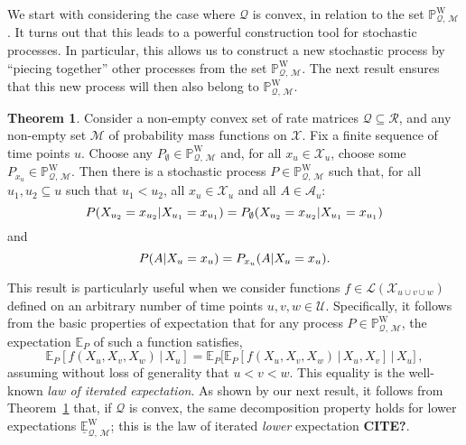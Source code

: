 \documentclass[10pt,a4paper]{paper}
\theoremstyle{definition}
\newtheorem{theorem}{Theorem}[section]
\newcommand{\states}{\mathcal{X}}
\newcommand{\processes}{\mathbb{P}}
\newcommand{\wprocesses}{\processes^{\mathrm{W}}}
\newcommand{\gambles}{\mathcal{L}}
\newcommand{\rateset}{\mathcal{Q}}
\begin{document}
We start with considering the case where $\rateset$ is convex, in relation to the set $\wprocesses_{\rateset,\,\mathcal{M}}$. It turns out that this leads to a powerful construction tool for stochastic processes. In particular, this allows us to construct a new stochastic process by ``piecing together'' other processes from the set $\wprocesses_{\rateset,\,\mathcal{M}}$. The next result ensures that this new process will then also belong to $\wprocesses_{\rateset,\,\mathcal{M}}$.
\begin{theorem}\label{theo:aanelkaarplakken}
Consider a non-empty convex set of rate matrices $\rateset\subseteq\mathcal{R}$, and any non-empty set $\mathcal{M}$ of probability mass functions on $\states$.
Fix a finite sequence of time points $u$. Choose any $P_\emptyset\in\wprocesses_{\rateset,\,\mathcal{M}}$ and, for all $x_u\in\states_u$, choose some $P_{x_u}\in\wprocesses_{\rateset,\,\mathcal{M}}$. Then there is a stochastic process $P\in\wprocesses_{\rateset,\,\mathcal{M}}$ such that, for all $u_1,u_2\subseteq u$ such that $u_1<u_2$, all $x_u\in\states_u$ and all $A\in\mathcal{A}_u$:
\begin{equation}\label{eq:theo:aanelkaarplakken:equalsfirst}
P(X_{u_2}=x_{u_2}\vert X_{u_1}=x_{u_1})=P_{\emptyset}(X_{u_2}=x_{u_2}\vert X_{u_1}=x_{u_1})
\vspace{-7pt}
\end{equation}
and
\begin{equation}\label{eq:theo:aanelkaarplakken:equalssecond}
P(A\vert X_u=x_u)=P_{x_u}(A\vert X_u=x_u).
\vspace{7pt}
\end{equation}
\end{theorem}

This result is particularly useful when we consider functions $f\in\gambles(\states_{u\cup v\cup w})$ defined on an arbitrary number of time points $u,v,w\in\mathcal{U}$. Specifically, it follows from the basic properties of expectation that for any process $P\in\wprocesses_{\rateset,\,\mathcal{M}}$, the expectation $\mathbb{E}_P$ of such a function satisfies,
\begin{equation*}
\mathbb{E}_P[f(X_u,X_v,X_w)\,\vert\,X_u] = \mathbb{E}_P\bigl[\mathbb{E}_P[f(X_u,X_v,X_w)\,\vert\,X_u,X_v]\,\big\vert\,X_u\bigr]\,,
\end{equation*}
assuming without loss of generality that $u<v<w$. This equality is the well-known \emph{law of iterated expectation}. As shown by our next result, it follows from Theorem~\ref{theo:aanelkaarplakken} that, if $\rateset$ is convex, the same decomposition property holds for lower expectations $\underline{\mathbb{E}}^{\mathrm{W}}_{\rateset,\,\mathcal{M}}$; this is the law of iterated \emph{lower} expectation {\bf CITE?}.
\end{document}
